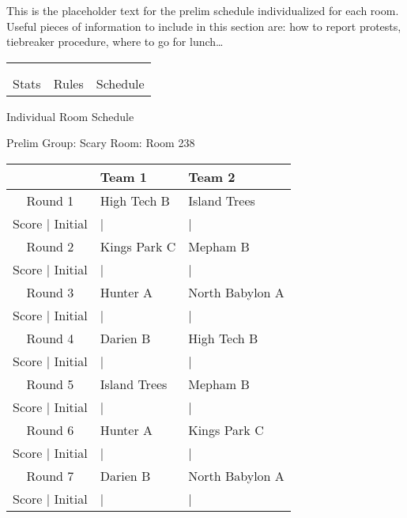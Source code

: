 \documentclass{article}%
\begin{document}
\vspace*{16pt}%
\linebreak%
This is the placeholder text for the prelim schedule individualized for each room. Useful pieces of information to include in this section are: how to report protests, tiebreaker procedure, where to go for lunch…%
\vspace*{30pt}%
\newline%
%
\begin{tabularx}{\textwidth}{YYY}%
  &  &  \\%
\\%
Stats&Rules&Schedule\\%
\end{tabularx}%
\newpage%
\begin{center}%
\begin{Huge}%
Individual Room Schedule%
\end{Huge}%
\vspace*{16pt}%
\linebreak%
\begin{Large}%
Prelim Group: Scary \hfill Room: Room 238%
\end{Large}%
\end{center}%
%
\begin{tabularx}{\textwidth}{|c|Y|Y|}%
\hline%
&Team 1&Team 2\\%
\hline%
Round 1&High Tech B&Island Trees\\%
\hline%
Score | Initial&|&|\\%
\hline%
Round 2&Kings Park C&Mepham B\\%
\hline%
Score | Initial&|&|\\%
\hline%
Round 3&Hunter A&North Babylon A\\%
\hline%
Score | Initial&|&|\\%
\hline%
Round 4&Darien B&High Tech B\\%
\hline%
Score | Initial&|&|\\%
\hline%
Round 5&Island Trees&Mepham B\\%
\hline%
Score | Initial&|&|\\%
\hline%
Round 6&Hunter A&Kings Park C\\%
\hline%
Score | Initial&|&|\\%
\hline%
Round 7&Darien B&North Babylon A\\%
\hline%
Score | Initial&|&|\\%
\hline%
\end{tabularx}%
\end{document}
